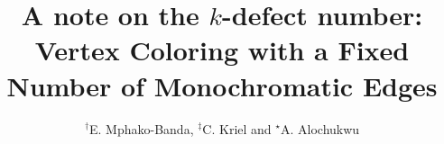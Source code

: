 \documentclass[12pt]{amsart}
\theoremstyle{definition}
\theoremstyle{remark}
\numberwithin{equation}{section}
\begin{document}
\title{A note on the $k$-defect number: \\
Vertex Coloring with a Fixed Number of Monochromatic Edges}

\author{$^\dag$E. Mphako-Banda, $^\ddag$C. Kriel and $^\star$A. Alochukwu }
\address{$^\dag$ $^\ddag$ School of Mathematics, University of the Witwatersrand, South Africa and \\ $^\star$Department of Mathematics, Computer Science and Physics, Albany State University, USA }





\date{}

\maketitle
\end{document}
